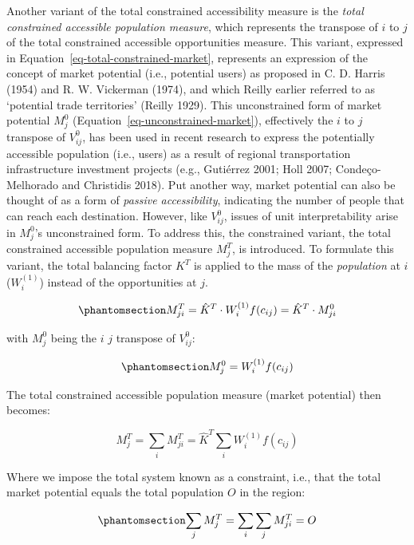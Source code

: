 \documentclass[
]{article}
\begin{document}
Another variant of the total constrained accessibility measure is the
\emph{total constrained accessible population measure}, which represents
the transpose of \(i\) to \(j\) of the total constrained accessible
opportunities measure. This variant, expressed in
Equation~\ref{eq-total-constrained-market}, represents an expression of
the concept of market potential (i.e., potential users) as proposed in
C. D. Harris (1954) and R. W. Vickerman (1974), and which Reilly earlier
referred to as `potential trade territories' (Reilly 1929). This
unconstrained form of market potential \(M_j^0\)
(Equation~\ref{eq-unconstrained-market}), effectively the \(i\) to \(j\)
transpose of \(V^0_{ij}\), has been used in recent research to express
the potentially accessible population (i.e., users) as a result of
regional transportation infrastructure investment projects (e.g.,
Gutiérrez 2001; Holl 2007; Condeço-Melhorado and Christidis 2018). Put
another way, market potential can also be thought of as a form of
\emph{passive accessibility}, indicating the number of people that can
reach each destination. However, like \(V_{ij}^0\), issues of unit
interpretability arise in \(M_j^0\)'s unconstrained form. To address
this, the constrained variant, the total constrained accessible
population measure \(M^T_{j}\), is introduced. To formulate this
variant, the total balancing factor \(K^T\) is applied to the mass of
the \emph{population} at \(i\) (\(W_i^{(1)}\)) instead of the
opportunities at \(j\).

\begin{equation}\phantomsection\label{eq-total-constrained-market}{
M^T_{ji} = \hat K^T \cdot W_i^{(1)} f(c_{ij}) = \hat K^T \cdot M_{ji}^0
}\end{equation}

\noindent with \(M_j^0\) being the \(i\) \(j\) transpose of
\(V^0_{ij}\):

\begin{equation}\phantomsection\label{eq-unconstrained-market}{
M_j^0 = W_i^{(1)} f(c_{ij})
}\end{equation}

The total constrained accessible population measure (market potential)
then becomes:

\[
M^T_j = \sum_i M^T_{ji} = \hat K^T \sum_i W^{(1)}_if(c_{ij})
\]

Where we impose the total system known as a constraint, i.e., that the
total market potential equals the total population \(O\) in the region:

\begin{equation}\phantomsection\label{eq-total-constraint-market}{
\sum_j M^T_{j} = \sum_i\sum_j M^T_{ji} = O
}\end{equation}
\end{document}
